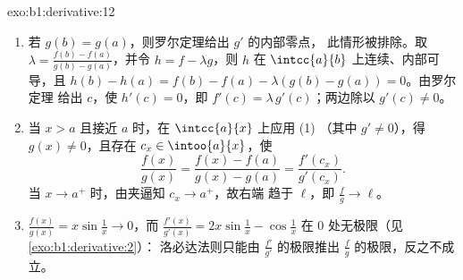 \begin{solution}{exo:b1:derivative:12}
\begin{enumerate}
  \item 若 $g(b) = g(a)$，则罗尔定理给出 $g'$ 的内部零点，
        此情形被排除。取 $\lambda = \frac{f(b) - f(a)}{g(b) -
        g(a)}$，并令 $h = f - \lambda g$，则 $h$ 在
        $\intcc{a}{b}$ 上连续、内部可导，且 $h(b) - h(a)
        = f(b) - f(a) - \lambda(g(b) - g(a)) = 0$。由罗尔定理
        给出 $c$，使 $h'(c) = 0$，即 $f'(c) =
        \lambda\,g'(c)$；两边除以 $g'(c) \neq 0$。
  \item 当 $x > a$ 且接近 $a$ 时，在 $\intcc{a}{x}$ 上应用 (1)
        （其中 $g' \neq 0$），得 $g(x) \neq 0$，且存在 $c_x \in
        \intoo{a}{x}$，使
        \[
        \frac{f(x)}{g(x)} = \frac{f(x) - f(a)}{g(x) - g(a)}
        = \frac{f'(c_x)}{g'(c_x)} .
        \]
        当 $x \to a^+$ 时，由夹逼知 $c_x \to a^+$，故右端
        趋于 $\ell$，即 $\frac{f}{g} \to \ell$。
  \item $\frac{f(x)}{g(x)} = x\sin\frac1x \to 0$，而
        $\frac{f'(x)}{g'(x)} = 2x\sin\frac1x - \cos\frac1x$ 在
        $0$ 处无极限（见\cref{exo:b1:derivative:2}）：
        洛必达法则只能由
        $\frac{f'}{g'}$ 的极限推出 $\frac fg$ 的极限，反之不成立。
\end{enumerate}
\end{solution}

